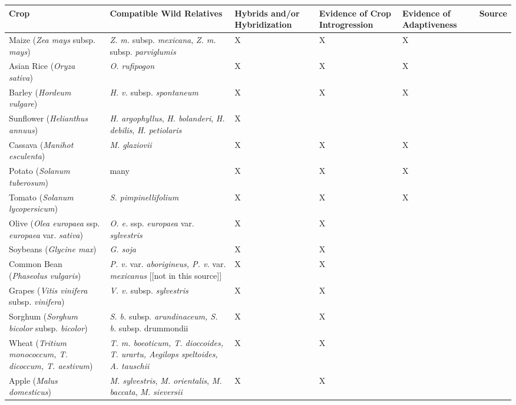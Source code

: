 \documentclass[11pt]{article}
\begin{document}
\begin{table}
\centering
\begin{adjustbox}{width=1\textwidth}
\small
\label{my-label}
\begin{tabular}{|p{5cm}|p{5cm}|p{2.6cm}|p{2.6cm}|p{2.6cm}|l|}
\hline
Crop & Compatible Wild Relatives & Hybrids and/or Hybridization & Evidence of Crop Introgression & Evidence of Adaptiveness & Source \\ \hline \hline
Maize (\emph{Zea mays} subsp. \emph{mays}) & \emph{Z. m.} subsp. \emph{mexicana}, \emph{Z. m. } subsp. \emph{parviglumis} & X & X & X & \cite{hufford2013genomic} \\ 
\hline 
Asian Rice (\emph{Oryza sativa}) & \emph{O. rufipogon} & X & X & X & \cite{Huang2012} \\ 
\hline
Barley (\emph{Hordeum vulgare}) & \emph{H. v.} subsp. \emph{spontaneum} & X & X & X & \cite{Poets2015} \\ \hline
Sunflower (\emph{Helianthus annuus}) & \emph{H. argophyllus}, \emph{H. bolanderi}, \emph{H. debilis}, \emph{H. petiolaris} & X &   &   & \cite{rieseberg2007hybridization}\\ 
\hline
Cassava (\emph{Manihot esculenta}) & \emph{M. glaziovii} & X & X & X & \cite{bredeson2016sequencing} \\ 
\hline
Potato (\emph{Solanum tuberosum}) & many & X & X & X & \cite{hardigan2017genome, johns1986ongoing, gavrilenko2013genetic} \\
\hline
Tomato (\emph{Solanum lycopersicum}) & \emph{S. pimpinellifolium} & X & X & X & \cite{rick1958role} \\
\hline
Olive (\emph{Olea europaea} ssp. \emph{europaea} var. \emph{sativa}) & \emph{O. e.} ssp. \emph{europaea} var. \emph{sylvestris} & X & X & & \cite{diez2015olive} \\ 
\hline
Soybeans (\emph{Glycine max}) & \emph{G. soja} & X & X &  & \cite{lam2010resequencing} \\ 
\hline
Common Bean (\emph{Phaseolus vulgaris}) & \emph{P. v.} var. \emph{aborigineus, P. v.} var. \emph{mexicanus} [[not in this source]]& X & X &  & \cite{papa2003asymmetry} \\
\hline
Grapes (\emph{Vitis vinifera} subsp. \emph{vinifera}) & \emph{V. v.} subsp. \emph{sylvestris} & X & X &  &  \cite{myles2011genetic} \\
\hline
Sorghum (\emph{Sorghum bicolor} subsp. \emph{bicolor}) & \emph{S. b.} subsp. \emph{arundinaceum, S. b.} subsp. {drummondii} & X & X &  & \cite{aldrich1992patterns} \\
\hline
Wheat (\emph{Tritium monococcum, T. dicoccum, T. aestivum}) & \emph{T. m. boeoticum, T. dioccoides, T. urartu, Aegilops speltoides, A. tauschii} & X & X &  & \cite{zohary1969wild} \\
\hline
Apple (\emph{Malus domesticus}) & \emph{M. sylvestris}, \emph{M. orientalis}, \emph{M. baccata}, \emph{M. sieversii}  & X & X & & \cite{cornille2012new} \\
\hline
\end{tabular}
\end{adjustbox}
\end{table}
\end{document}
